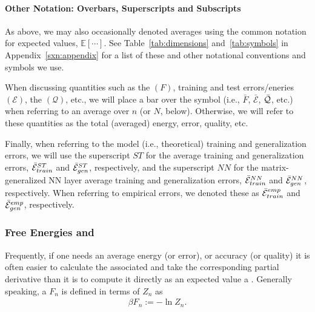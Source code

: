 \paragraph{Other Notation: Overbars, Superscripts and Subscripts}
As above, we may also occasionally denoted averages using the common notation for expected values, $\mathbb{E}[\cdots]$.
See Table~\ref{tab:dimensions} and~\ref{tab:symbols} in Appendix~\ref{sxn:appendix} for a list of these and other notational conventions and symbols we use.

When discussing quantities such as the \FreeEnergy $(F)$, 
training and test errors/eneries $(\mathcal{E})$, 
the \LayerQuality $(\mathcal{Q})$, etc.,
we will place a bar over the symbol (i.e., $\bar{F}$, $\bar{\mathcal{E}}$, $\bar{\mathcal{Q}}$, etc.) when referring to
an average over $n$ (or $N$, below). 
Otherwise, we will refer to these quantities as the total (averaged) energy, error, quality, etc.


Finally, when referring to the model (i.e., theoretical)
training and generalization errors, we will use the superscript $ST$ for
the average \StudentTeacher training and generalization errors, $\bar{\mathcal{E}}^{ST}_{train}$ and $\bar{\mathcal{E}}^{ST}_{gen}$, respectively, and
the superscript $NN$ for the matrix-generalized NN layer average
training and generalization errors, $\bar{\mathcal{E}}^{NN}_{train}$ and $\bar{\mathcal{E}}^{NN}_{gen}$, respectively.
When referring to empirical errors, we denoted these as $\bar{\mathcal{E}}^{emp}_{train}$ and $\bar{\mathcal{E}}^{emp}_{gen}$, respectively.


\subsubsection{Free Energies and \GeneratingFunctions} 
\label{sxn:mathP_free_energies}


Frequently, if one needs an average energy (or error), or accuracy (or quality)
it is often easier to calculate the associated \FreeEnergy and take the corresponding partial derivative
than it is to compute it directly as an expected value a \ThermalAverage.
Generally speaking, a \FreeEnergy $F_n$ is defined in terms of $Z_{n}$ as
\begin{align}
\label{eqn:F}
\beta F_n:=-\ln Z_{n}.
\end{align}


